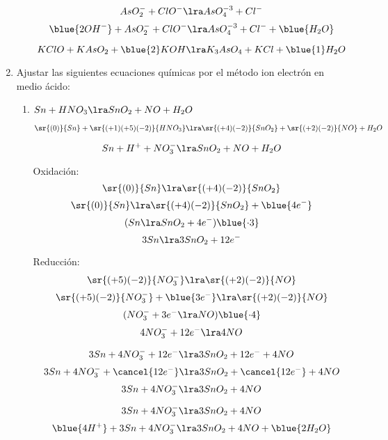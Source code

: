 \documentclass[../Práctica.root.tex]{subfiles}
\begin{document}
\begin{enumerate}
\begin{enumerate}
                    \[ AsO_2^- + ClO^- \lra AsO_4^{-3} + Cl^- \]
                    \[ \blue{2OH^-} + AsO_2^- + ClO^- \lra AsO_4^{-3} + Cl^- + \blue{H_2O} \]

                    \[ KClO + KAsO_2 + \blue{2} KOH \lra K_3AsO_4 + KCl + \blue{1} H_2O \]
          \end{enumerate}

    \item Ajustar las siguientes ecuaciones químicas por el método ion electrón en medio ácido:
          \begin{enumerate}
              \item $Sn + HNO_3 \lra SnO_2 + NO + H_2O$

                    $\sr{(0)}{Sn} + \sr{(+1)(+5)(-2)}{HNO_3} \lra \sr{(+4)(-2)}{SnO_2} + \sr{(+2)(-2)}{NO} + H_2O$

                    \[ Sn + H^+ + NO_3^- \lra SnO_2 + NO + H_2O \]

                    \begin{multicols}{2}
                        Oxidación:
                        \[ \sr{(0)}{Sn} \lra \sr{(+4)(-2)}{SnO_2} \]
                        \[ \sr{(0)}{Sn} \lra \sr{(+4)(-2)}{SnO_2} + \blue{4 e^-} \]
                        \[ (Sn \lra SnO_2 + 4 e^-)\blue{\cdot 3} \]
                        \[ 3 Sn \lra 3 SnO_2 + 12 e^- \]

                        \columnbreak

                        Reducción:
                        \[ \sr{(+5)(-2)}{NO_3^-} \lra \sr{(+2)(-2)}{NO} \]
                        \[ \sr{(+5)(-2)}{NO_3^-} + \blue{3e^-} \lra \sr{(+2)(-2)}{NO} \]
                        \[ (NO_3^- + 3e^- \lra NO)\blue{\cdot 4} \]
                        \[ 4 NO_3^- + 12 e^- \lra 4 NO \]
                    \end{multicols}

                    \[ 3 Sn + 4 NO_3^- + 12 e^- \lra 3 SnO_2 + 12 e^- + 4 NO \]
                    \[ 3 Sn + 4 NO_3^- + \cancel{12 e^-} \lra 3 SnO_2 + \cancel{12 e^-} + 4 NO \]
                    \[ 3 Sn + 4 NO_3^- \lra 3 SnO_2 + 4 NO \]

                    \[ 3 Sn + 4 NO_3^- \lra 3 SnO_2 + 4 NO \]
                    \[ \blue{4H^+} + 3 Sn + 4 NO_3^- \lra 3 SnO_2 + 4 NO + \blue{2H_2O} \]


\end{enumerate}
\end{enumerate}
\end{document}
